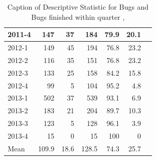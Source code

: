 \documentclass[UKenglish]{ifimaster}  %
\begin{document}
\begin{table}[!htbp]
\begin{adjustwidth}{-2.5cm}{}
{{\begin{tabular}{ | l | r | r | r | r | r | r | }
2011-4 & 147 & 37 & 184 & 79.9 & 20.1 \\ \hline
2012-1 & 149 & 45 & 194 & 76.8 & 23.2 \\ \hline
2012-2 & 116 & 35 & 151 & 76.8 & 23.2 \\ \hline
2012-3 & 133 & 25 & 158 & 84.2 & 15.8 \\ \hline
2012-4 & 99 & 5 & 104 & 95.2 & 4.8 \\ \hline
2013-1 & 502 & 37 & 539 & 93.1 & 6.9 \\ \hline
2013-2 & 183 & 21 & 204 & 89.7 & 10.3 \\ \hline
2013-3 & 123 & 5 & 128 & 96.1 & 3.9 \\ \hline
2013-4 & 15 & 0 & 15 & 100 & 0 \\ \hline
Mean & 109.9&	18.6&128.5&74.3&25.7 \\ \hline

\end{tabular}
}
}
\end{adjustwidth}
\caption[Optional caption for list of figures]{Caption of Descriptive Statistic for Bugs and Bugs finished within quarter  , }
\label{DS:2:5} %
\end{table}
\end{document}
